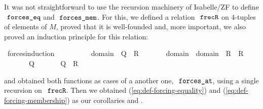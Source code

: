 It was not straightforward to use the recursion machinery of
Isabelle/ZF to define $\forceseq$ and $\forcesmem$. For this, we
defined a relation $\frecR$ on 4-tuples of elements of $M$, proved
that it is well-founded and, more important, we also proved an
induction principle for this relation:
%
\begin{isabelle}
\isamarkupfalse%
\ forces{\isacharunderscore}induction{\isacharcolon}\isanewline
\ \ \isanewline
\ \ \ \ {\isachardoublequoteopen}{\isasymAnd}{\isasymtau}\ {\isasymtheta}{\isachardot}\ {\isasymlbrakk}{\isasymAnd}{\isasymsigma}{\isachardot}\ {\isasymsigma}{\isasymin}domain{\isacharparenleft}{\isasymtheta}{\isacharparenright}\ {\isasymLongrightarrow}\ Q{\isacharparenleft}{\isasymtau}{\isacharcomma}{\isasymsigma}{\isacharparenright}{\isasymrbrakk}\ {\isasymLongrightarrow}\ R{\isacharparenleft}{\isasymtau}{\isacharcomma}{\isasymtheta}{\isacharparenright}{\isachardoublequoteclose}\footnotemark\isanewline
\ \ \ \ {\isachardoublequoteopen}{\isasymAnd}{\isasymtau}\ {\isasymtheta}{\isachardot}\ {\isasymlbrakk}{\isasymAnd}{\isasymsigma}{\isachardot}\ {\isasymsigma}{\isasymin}domain{\isacharparenleft}{\isasymtau}{\isacharparenright}\ {\isasymunion}\ domain{\isacharparenleft}{\isasymtheta}{\isacharparenright}\ {\isasymLongrightarrow}\ R{\isacharparenleft}{\isasymsigma}{\isacharcomma}{\isasymtau}{\isacharparenright}\ {\isasymand}\ R{\isacharparenleft}{\isasymsigma}{\isacharcomma}{\isasymtheta}{\isacharparenright}{\isasymrbrakk}\isanewline
\ \ \ \ \ \  {\isasymLongrightarrow}\ Q{\isacharparenleft}{\isasymtau}{\isacharcomma}{\isasymtheta}{\isacharparenright}{\isachardoublequoteclose}\isanewline
\ \ \isanewline
\ \ \ \ {\isachardoublequoteopen}Q{\isacharparenleft}{\isasymtau}{\isacharcomma}{\isasymtheta}{\isacharparenright}\ {\isasymand}\ R{\isacharparenleft}{\isasymtau}{\isacharcomma}{\isasymtheta}{\isacharparenright}{\isachardoublequoteclose}
\end{isabelle}
%
and 
obtained both functions as cases of a another one, 
$\forcesat$, using a single recursion on $\frecR$. Then we obtained 
(\ref{eq:def-forcing-equality}) and (\ref{eq:def-forcing-membership})
as our corollaries  and
.


